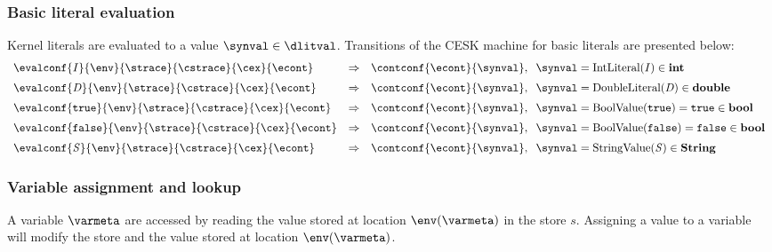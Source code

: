 \documentclass{article}
\begin{document}
\subsubsection{Basic literal evaluation}
\label{subsubsec:basic-literal-eval}
Kernel literals are evaluated to a value $\synval \in \dlitval$. Transitions of the CESK machine for basic literals are presented below:
\[
  \begin{array}{lcll}
	\evalconf{\IntLiteral{\integermeta}}{\env}{\strace}{\cstrace}{\cex}{\econt}
	& \Rightarrow &
	\contconf{\econt}{\synval},
	\hspace{2mm}\synval = \mathrm{IntLiteral(\integermeta)} \in \mathbf{int}\\[2mm]

	\evalconf{\DoubleLiteral{\doublemeta} }{\env}{\strace}{\cstrace}{\cex}{\econt}
	& \Rightarrow &
	\contconf{\econt}{\synval},
	\hspace{2mm}\synval = \mathrm{DoubleLiteral(\doublemeta)} \in \mathbf{double}\\[2mm]

	\evalconf{\BoolLiteral{\tt{true}}}{\env}{\strace}{\cstrace}{\cex}{\econt}
	& \Rightarrow &
	\contconf{\econt}{\synval},
	\hspace{2mm}\synval = \mathrm{BoolValue(\tt{true})} = \tt{true}\in \mathbf{bool}\\[2mm]

	\evalconf{\BoolLiteral{\tt{false}}}{\env}{\strace}{\cstrace}{\cex}{\econt}
	& \Rightarrow &
	\contconf{\econt}{\synval},
	\hspace{2mm}\synval = \mathrm{BoolValue(\tt{false})} = \tt{false}\in \mathbf{bool}\\[2mm]

	\evalconf{\StringLiteral{\stringmeta}}{\env}{\strace}{\cstrace}{\cex}{\econt}
	& \Rightarrow &
	\contconf{\econt}{\synval},
	\hspace{2mm}\synval = \mathrm{StringValue(\stringmeta)} \in \mathbf{String}

  \end{array}
\]

\subsubsection{Variable assignment and lookup}
\label{subsubsec:variable-assignment-and-lookup}
A variable $\varmeta$ are accessed by reading the value stored at location $\env(\varmeta)$ in the store $s$. Assigning a value to a variable will modify the store and the value stored at location  $\env(\varmeta)$.
\end{document}
